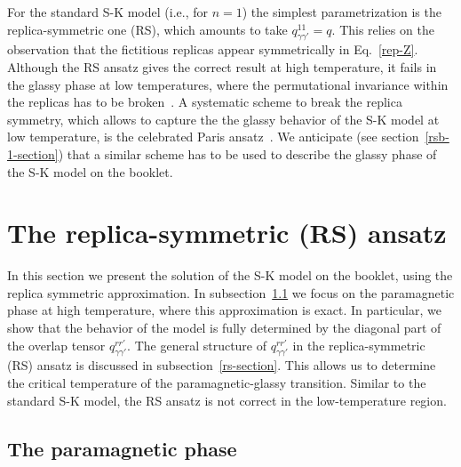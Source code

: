 \documentclass[twocolumn,superscriptaddress,prb,10pt]{revtex4-1}
\begin{document}
For the standard S-K model (i.e., for $n=1$) the simplest parametrization is the 
replica-symmetric one (RS), which amounts to take $q^{11}_{\gamma\gamma'}=q$. 
This relies on the observation that the fictitious replicas appear symmetrically 
in Eq.~\eqref{rep-Z}. Although the RS ansatz gives the correct result at high 
temperature, it fails in the glassy phase at low temperatures, where the permutational 
invariance within the replicas has to be broken~\cite{almeida-1978}. A systematic 
scheme to break the replica symmetry, which allows to capture the the glassy behavior 
of the S-K model at low temperature, is the celebrated Paris ansatz~\cite{parisi-1979}. 
We anticipate (see section~\ref{rsb-1-section}) that a similar scheme has to be used to 
describe the glassy phase of the S-K model on the booklet. 


\section{The replica-symmetric (RS) ansatz}
\label{solution}

In this section we present the solution of the S-K model on the booklet, using 
the replica symmetric approximation. In subsection~\ref{para-section} we focus 
on the paramagnetic phase at high temperature, where this approximation is exact. 
In particular, we show that the behavior of the model is fully determined by the 
diagonal part of the overlap tensor $q_{\gamma\gamma'}^{rr'}$. The general structure 
of $q_{\gamma\gamma'}^{rr'}$ in the replica-symmetric (RS) ansatz  is discussed in 
subsection~\ref{rs-section}. This allows us to determine the critical temperature of 
the paramagnetic-glassy transition. Similar to the standard S-K model, the RS ansatz 
is not correct in the low-temperature region. 

\subsection{The paramagnetic phase}
\label{para-section}
\end{document}
